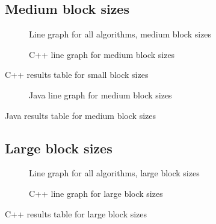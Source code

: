 \subsection{Medium block sizes}
\begin{figure}
    \centering
    
    \caption{Line graph for all algorithms, medium block sizes}
    \label{fig:all:line:medium}
\end{figure}

\begin{figure}
    \centering
    
    \caption{C++ line graph for medium block sizes}
    \label{fig:cpp:line:medium}
\end{figure}
\begin{table}
    \centering
    \caption{C++ results table for small block sizes}
    \label{tab:cpp:medium}
    \resizebox{\columnwidth}{!}{
        
    }
\end{table}


\begin{figure}
    \centering
    
    \caption{Java line graph for medium block sizes}
    \label{fig:java:line:medium}
\end{figure}
\begin{table}
    \centering
    \caption{Java results table for medium block sizes}
    \label{tab:java:medium}
    
\end{table}

\subsection{Large block sizes}

\begin{figure}
    \centering
    
    \caption{Line graph for all algorithms, large block sizes}
    \label{fig:all:line:large}
\end{figure}

\begin{figure}
    \centering
    
    \caption{C++ line graph for large block sizes}
    \label{fig:cpp:line:large}
\end{figure}
\begin{table}
    \centering
    \caption{C++ results table for large block sizes}
    \label{tab:cpp:large}
    \resizebox{\columnwidth}{!}{
        
    }
\end{table}


